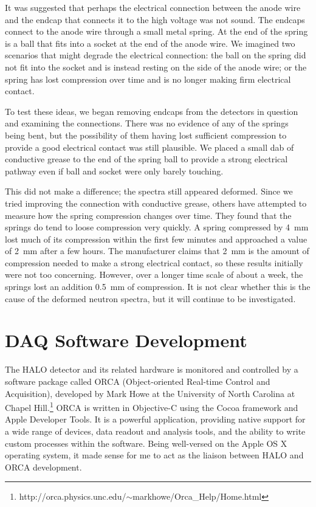		It was suggested that perhaps the electrical connection between the anode wire and the endcap that connects it to the high voltage was not sound. The endcaps connect to the anode wire through a small metal spring. At the end of the spring is a ball that fits into a socket at the end of the anode wire. We imagined two scenarios that might degrade the electrical connection: the ball on the spring did not fit into the socket and is instead resting on the side of the anode wire; or the spring has lost compression over time and is no longer making firm electrical contact.

		To test these ideas, we began removing endcaps from the detectors in question and examining the connections. There was no evidence of any of the springs being bent, but the possibility of them having lost sufficient compression to provide a good electrical contact was still plausible. We placed a small dab of conductive grease to the end of the spring ball to provide a strong electrical pathway even if ball and socket were only barely touching. 

		This did not make a difference; the spectra still appeared deformed. Since we tried improving the connection with conductive grease, others have attempted to measure how the spring compression changes over time. They found that the springs do tend to loose compression very quickly. A spring compressed by \SI{4}{\milli\metre} lost much of its compression within the first few minutes and approached a value of \SI{2}{\milli\metre} after a few hours. The manufacturer claims that \SI{2}{\milli\metre} is the amount of compression needed to make a strong electrical contact, so these results initially were not too concerning. However, over a longer time scale of about a week, the springs lost an addition \SI{0.5}{\milli\metre} of compression\cite{spring_test}. It is not clear whether this is the cause of the deformed neutron spectra, but it will continue to be investigated.

	\section{DAQ Software Development}
	\label{sec:orca_development}
		The HALO detector and its related hardware is monitored and controlled by a software package called ORCA (Object-oriented Real-time Control and Acquisition), developed by Mark Howe at the University of North Carolina at Chapel Hill.\footnote{http://orca.physics.unc.edu/$\sim$markhowe/Orca\_Help/Home.html} ORCA is written in Objective-C using the Cocoa framework and Apple Developer Tools. It is a powerful application, providing native support for a wide range of devices, data readout and analysis tools, and the ability to write custom processes within the software. Being well-versed on the Apple OS X operating system, it made sense for me to act as the liaison between HALO and ORCA development. 

